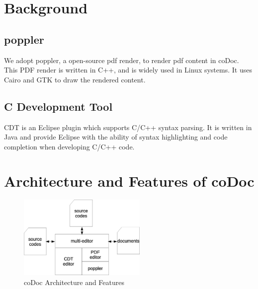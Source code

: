 \documentclass[11pt,letterpaper,oneside]{article}
\begin{document}
\section{Background}
\label{sec:background}
\subsection{poppler}
We adopt poppler, a open-source pdf render, to render pdf content in coDoc.
This PDF render is written in C++, 
and is widely used in Linux systems.
It uses Cairo and GTK to draw the rendered content.

\subsection{C Development Tool}
CDT is an Eclipse plugin which supports C/C++ syntax parsing.
It is written in Java and provide Eclipse with the ability of syntax highlighting and code completion when developing C/C++ code.


\section{Architecture and Features of coDoc}
\label{sec:arch}

\begin{figure}
\begin{center}
\includegraphics[width=0.55\textwidth]{architecture.eps}
\caption{coDoc Architecture and Features}
\label{fig:architecture}
\end{center}
\end{figure}
\end{document}

